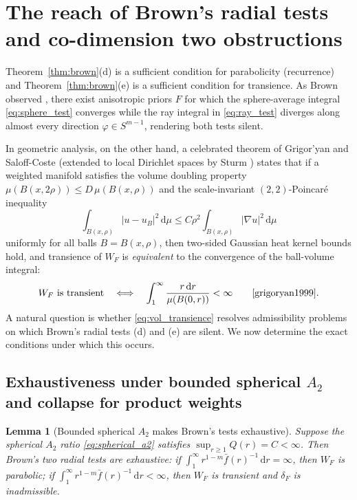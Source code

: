 \documentclass[a4paper,11pt,noarxiv]{quantumarticle}
\newcommand{\abs}[1]{\lvert #1\rvert}
\newcommand{\dd}{\,\mathrm{d}}
\newcommand{\grad}{\nabla}
\newcommand{\fbar}{\bar f}
\theoremstyle{plain}
\newtheorem{lemma}[theorem]{Lemma}
\theoremstyle{definition}
\theoremstyle{remark}
\begin{document}
\section{The reach of Brown's radial tests and co-dimension two obstructions}
\label{sec:reach}

Theorem~\ref{thm:brown}(d) is a sufficient condition for parabolicity
(recurrence) and Theorem~\ref{thm:brown}(e) is a sufficient condition
for transience. As Brown observed \cite[p.~900]{brown1971}, there exist
anisotropic priors $F$ for which the sphere-average integral
\eqref{eq:sphere_test} converges while the ray integral in
\eqref{eq:ray_test} diverges along almost every direction
$\varphi\in S^{m-1}$, rendering both tests silent.

In geometric analysis, on the other hand, a celebrated theorem of
Grigor'yan \cite{grigoryan1991} and Saloff-Coste \cite{saloffcoste1992}
(extended to local Dirichlet spaces by Sturm \cite{sturm1996}) states
that if a weighted manifold satisfies the volume doubling property
$\mu(B(x,2\rho))\le D\,\mu(B(x,\rho))$ and the scale-invariant $(2,2)$-Poincar\'e
inequality
\begin{equation}\label{eq:poincare}
\int_{B(x,\rho)}\abs{u-u_B}^2\dd\mu
\le C\rho^2\int_{B(x,\rho)}\abs{\grad u}^2\dd\mu
\end{equation}
uniformly for all balls $B=B(x,\rho)$, then two-sided Gaussian heat
kernel bounds hold, and transience of $W_F$ is \emph{equivalent} to the
convergence of the ball-volume integral:
\begin{equation}\label{eq:vol_transience}
W_F \text{ is transient} \quad\Longleftrightarrow\quad
\int_1^\infty\frac{r\dd r}{\mu(B(0,r))}<\infty
\qquad\text{\cite[Thm.\ 11.1]{grigoryan1999}}.
\end{equation}
A natural question is whether \eqref{eq:vol_transience} resolves
admissibility problems on which Brown's radial tests (d) and (e) are
silent. We now determine the exact conditions under which this occurs.

\subsection{Exhaustiveness under bounded spherical \texorpdfstring{$A_2$}{A2}
and collapse for product weights}

\begin{lemma}[Bounded spherical $A_2$ makes Brown's tests exhaustive]
\label{lem:exhaustive}
Suppose the spherical $A_2$ ratio \eqref{eq:spherical_a2} satisfies
$\sup_{r\ge1}Q(r)=C<\infty$. Then Brown's two radial tests are
exhaustive: if $\int_1^\infty r^{1-m}\fbar(r)^{-1}\dd r=\infty$, then
$W_F$ is parabolic; if $\int_1^\infty r^{1-m}\fbar(r)^{-1}\dd r<\infty$,
then $W_F$ is transient and $\delta_F$ is inadmissible.
\end{lemma}
\end{document}
